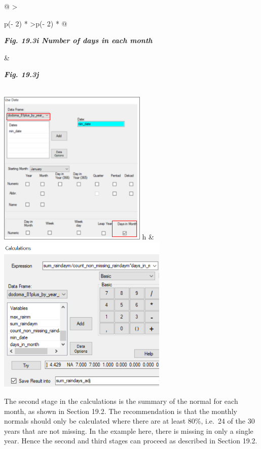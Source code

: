 \documentclass[
  letterpaper,
  DIV=11,
  numbers=noendperiod]{scrreprt}
\begin{document}
\begin{longtable}[]{@{}
  >{\raggedright\arraybackslash}p{(\columnwidth - 2\tabcolsep) * }
  >{\centering\arraybackslash}p{(\columnwidth - 2\tabcolsep) * }@{}}
\toprule\noalign{}
\begin{minipage}[b]{\linewidth}\raggedright
\textbf{\emph{Fig. 19.3i Number of days in each month}}
\end{minipage} & \begin{minipage}[b]{\linewidth}\centering
\textbf{\emph{Fig. 19.3j}}
\end{minipage} \\
\midrule\noalign{}
\endhead
\bottomrule\noalign{}
\endlastfoot
\includegraphics[width=2.79055in,height=2.93129in]{figures/Fig19.3i.png}
h &
\includegraphics[width=3.18348in,height=\textheight]{figures/Fig19.3j.png} \\
\end{longtable}

The second stage in the calculations is the summary of the normal for
each month, as shown in Section 19.2. The recommendation is that the
monthly normals should only be calculated where there are at least 80\%,
i.e.~24 of the 30 years that are not missing. In the example here, there
is missing in only a single year. Hence the second and third stages can
proceed as described in Section 19.2.
\end{document}
